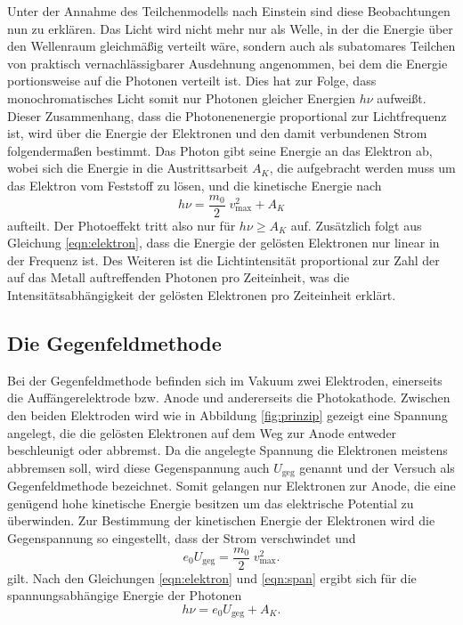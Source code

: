 Unter der Annahme des Teilchenmodells nach Einstein sind diese Beobachtungen nun zu erklären.
Das Licht wird nicht mehr nur als Welle, in der die Energie über den Wellenraum gleichmäßig verteilt wäre, sondern auch als subatomares Teilchen von praktisch vernachlässigbarer Ausdehnung angenommen, bei dem die Energie portionsweise auf die Photonen verteilt ist.
Dies hat zur Folge, dass monochromatisches Licht somit nur Photonen gleicher Energien $h \nu$ aufwei\ss{}t.
Dieser Zusammenhang, dass die Photonenenergie proportional zur Lichtfrequenz ist, wird über die Energie der Elektronen und den damit verbundenen Strom folgendermaßen bestimmt.
Das Photon gibt seine Energie an das Elektron ab, wobei sich die Energie in die Austrittsarbeit $A_K$, die aufgebracht werden muss um das Elektron vom Feststoff zu lösen, und die kinetische Energie nach 
\begin{equation}
    \label{eqn:elektron}
    h \nu = \frac{m_0}{2} \; v_\text{max}^2 + A_K 
\end{equation}
aufteilt.
Der Photoeffekt tritt also nur für $h \nu \geq A_K$ auf.
Zusätzlich folgt aus Gleichung \ref{eqn:elektron}, dass die Energie der gelösten Elektronen nur linear in der Frequenz ist.
Des Weiteren ist die Lichtintensität proportional zur Zahl der auf das Metall auftreffenden Photonen pro Zeiteinheit, was die Intensitätsabhängigkeit der gelösten Elektronen pro Zeiteinheit erklärt.
 
\subsection{Die Gegenfeldmethode}
Bei der Gegenfeldmethode befinden sich im Vakuum zwei Elektroden, einerseits die Auffängerelektrode bzw. Anode und andererseits die Photokathode.
Zwischen den beiden Elektroden wird wie in Abbildung \ref{fig:prinzip} gezeigt eine Spannung angelegt, die die gelösten Elektronen auf dem Weg zur Anode entweder beschleunigt oder abbremst.
Da die angelegte Spannung die Elektronen meistens abbremsen soll, wird diese Gegenspannung auch $U_\text{geg}$ genannt und der Versuch als Gegenfeldmethode bezeichnet.
Somit gelangen nur Elektronen zur Anode, die eine genügend hohe kinetische Energie besitzen um das elektrische Potential zu überwinden.
Zur Bestimmung der kinetischen Energie der Elektronen wird die Gegenspannung so eingestellt, dass der Strom verschwindet und 
\begin{equation}
    \label{eqn:span}
    e_0 U_\text{geg} = \frac{m_0}{2} \;v_\text{max}^2.
\end{equation}
gilt.
Nach den Gleichungen \ref{eqn:elektron} und \ref{eqn:span} ergibt sich für die spannungsabhängige Energie der Photonen
\begin{equation}
    \label{eqn:photon}
    h \nu = e_0 U_\text{geg} + A_K.
\end{equation}

